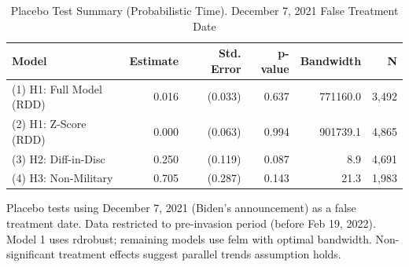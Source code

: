 \begin{table}[t]
\caption{\label{tab:s12}Placebo Test Summary (Probabilistic Time). December 7, 2021 False Treatment Date}
\fontsize{12.0pt}{14.0pt}\selectfont
\begin{tabular*}{\linewidth}{@{\extracolsep{\fill}}lrrrrr}
\toprule
Model & Estimate & Std. Error & p-value & Bandwidth & N \\ 
\midrule\addlinespace[2.5pt]
(1) H1: Full Model (RDD) & 0.016 & (0.033) & 0.637 & 771160.0 & 3,492 \\ 
(2) H1: Z-Score (RDD) & 0.000 & (0.063) & 0.994 & 901739.1 & 4,865 \\ 
(3) H2: Diff-in-Disc & 0.250 & (0.119) & 0.087 & 8.9 & 4,691 \\ 
(4) H3: Non-Military & 0.705 & (0.287) & 0.143 & 21.3 & 1,983 \\ 
\bottomrule
\end{tabular*}
\begin{minipage}{\linewidth}
\vspace{.05em}
Placebo tests using December 7, 2021 (Biden's announcement) as a false treatment
date. Data restricted to pre-invasion period (before Feb 19, 2022). Model 1
uses rdrobust; remaining models use felm with optimal bandwidth. Non-significant
treatment effects suggest parallel trends assumption holds.\\
\end{minipage}
\end{table}

